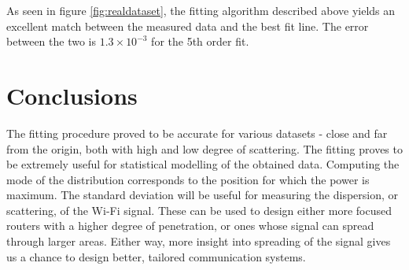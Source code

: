 \documentclass[a4paper]{article}
\numberwithin{equation}{section}
\begin{document}
\noindent As seen in figure \ref{fig:realdataset}, the fitting algorithm described above yields an excellent match between the measured data and the best fit line. The error between the two is $1.3 \times 10^{-3}$ for the 5th order fit.

\section{Conclusions}
The fitting procedure proved to be accurate for various datasets - close and far from the origin, both with high and low degree of scattering. The fitting proves to be extremely useful for statistical modelling of the obtained data. Computing the mode of the distribution corresponds to the position for which the power is maximum. The standard deviation will be useful for measuring the dispersion, or scattering, of the Wi-Fi signal. These can be used to design either more focused routers with a higher degree of penetration, or ones whose signal can spread through larger areas. Either way, more insight into spreading of the signal gives us a chance to design better, tailored communication systems.
\end{document}
